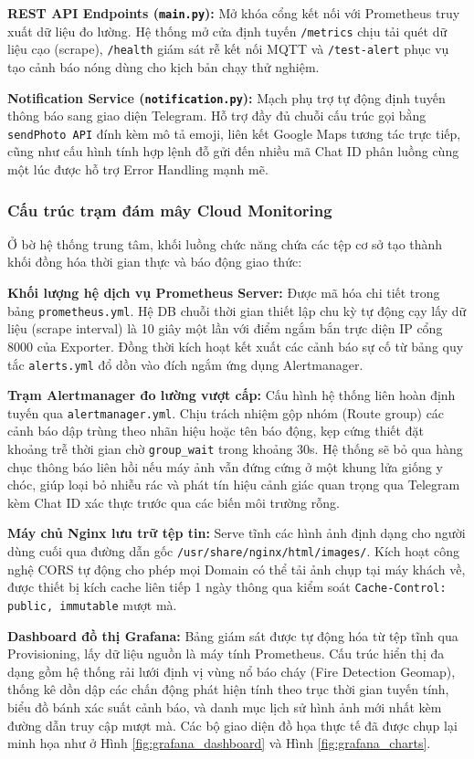 \documentclass[12pt,a4paper]{report}
\begin{document}
\textbf{REST API Endpoints (\texttt{main.py}):} Mở khóa cổng kết nối với Prometheus truy xuất dữ liệu đo lường. Hệ thống mở cửa định tuyến \texttt{/metrics} chịu tải quét dữ liệu cạo (scrape), \texttt{/health} giám sát rễ kết nối MQTT và \texttt{/test-alert} phục vụ tạo cảnh báo nóng dùng cho kịch bản chạy thử nghiệm.

\textbf{Notification Service (\texttt{notification.py}):} Mạch phụ trợ tự động định tuyến thông báo sang giao diện Telegram. Hỗ trợ đầy đủ chuỗi cấu trúc gọi bằng \texttt{sendPhoto API} đính kèm mô tả emoji, liên kết Google Maps tương tác trực tiếp, cũng như cấu hình tính hợp lệnh đỗ gửi đến nhiều mã Chat ID phân luồng cùng một lúc được hỗ trợ Error Handling mạnh mẽ.

\subsubsection{Cấu trúc trạm đám mây Cloud Monitoring}

Ở bờ hệ thống trung tâm, khối luồng chức năng chứa các tệp cơ sở tạo thành khối đồng hóa thời gian thực và báo động giao thức:

\textbf{Khối lượng hệ dịch vụ Prometheus Server:} Được mã hóa chi tiết trong bảng \texttt{prometheus.yml}. Hệ DB chuỗi thời gian thiết lập chu kỳ tự động cạy lấy dữ liệu (scrape interval) là 10 giây một lần với điểm ngắm bắn trực diện IP cổng 8000 của Exporter. Đồng thời kích hoạt kết xuất các cảnh báo sự cố từ bảng quy tắc \texttt{alerts.yml} đổ dồn vào đích ngắm ứng dụng Alertmanager.

\textbf{Trạm Alertmanager đo lường vượt cấp:} Cấu hình hệ thống liên hoàn định tuyến qua \texttt{alertmanager.yml}. Chịu trách nhiệm gộp nhóm (Route group) các cảnh báo dập trùng theo nhãn hiệu hoặc tên báo động, kẹp cứng thiết đặt khoảng trễ thời gian chờ \texttt{group\_wait} trong khoảng 30s. Hệ thống sẽ bỏ qua hàng chục thông báo liên hồi nếu máy ảnh vẫn đứng cứng ở một khung lửa giống y chóc, giúp loại bỏ nhiễu rác và phát tín hiệu cảnh giác quan trọng qua Telegram kèm Chat ID xác thực trước qua các biến môi trường rỗng.

\textbf{Máy chủ Nginx lưu trữ tệp tin:} Serve tĩnh các hình ảnh định dạng cho người dùng cuối qua đường dẫn gốc \texttt{/usr/share/nginx/html/images/}. Kích hoạt công nghệ CORS tự động cho phép mọi Domain có thể tải ảnh chụp tại máy khách về, được thiết bị kích cache liên tiếp 1 ngày thông qua kiểm soát \texttt{Cache-Control: public, immutable} mượt mà.

\textbf{Dashboard đồ thị Grafana:} Bảng giám sát được tự động hóa từ tệp tĩnh qua Provisioning, lấy dữ liệu nguồn là máy tính Prometheus. Cấu trúc hiển thị đa dạng gồm hệ thống rải lưới định vị vùng nổ báo cháy (Fire Detection Geomap), thống kê dồn dập các chấn động phát hiện tính theo trục thời gian tuyến tính, biểu đồ bánh xác suất cảnh báo, và danh mục lịch sử hình ảnh mới nhất kèm đường dẫn truy cập mượt mà. Các bộ giao diện đồ họa thực tế đã được chụp lại minh họa như ở Hình \ref{fig:grafana_dashboard} và Hình \ref{fig:grafana_charts}.
\end{document}
